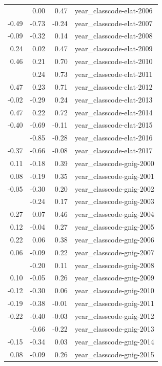 \documentclass[]{article}
\begin{document}
\begin{longtable}[t]{rrrl}
\addlinespace
0.24 & 0.00 & 0.47 & year\_classcode-elat-2006\\
-0.49 & -0.73 & -0.24 & year\_classcode-elat-2007\\
-0.09 & -0.32 & 0.14 & year\_classcode-elat-2008\\
0.24 & 0.02 & 0.47 & year\_classcode-elat-2009\\
0.46 & 0.21 & 0.70 & year\_classcode-elat-2010\\
\addlinespace
0.48 & 0.24 & 0.73 & year\_classcode-elat-2011\\
0.47 & 0.23 & 0.71 & year\_classcode-elat-2012\\
-0.02 & -0.29 & 0.24 & year\_classcode-elat-2013\\
0.47 & 0.22 & 0.72 & year\_classcode-elat-2014\\
-0.40 & -0.69 & -0.11 & year\_classcode-elat-2015\\
\addlinespace
-0.57 & -0.85 & -0.28 & year\_classcode-elat-2016\\
-0.37 & -0.66 & -0.08 & year\_classcode-elat-2017\\
0.11 & -0.18 & 0.39 & year\_classcode-gnig-2000\\
0.08 & -0.19 & 0.35 & year\_classcode-gnig-2001\\
-0.05 & -0.30 & 0.20 & year\_classcode-gnig-2002\\
\addlinespace
-0.04 & -0.24 & 0.17 & year\_classcode-gnig-2003\\
0.27 & 0.07 & 0.46 & year\_classcode-gnig-2004\\
0.12 & -0.04 & 0.27 & year\_classcode-gnig-2005\\
0.22 & 0.06 & 0.38 & year\_classcode-gnig-2006\\
0.06 & -0.09 & 0.22 & year\_classcode-gnig-2007\\
\addlinespace
-0.04 & -0.20 & 0.11 & year\_classcode-gnig-2008\\
0.10 & -0.05 & 0.26 & year\_classcode-gnig-2009\\
-0.12 & -0.30 & 0.06 & year\_classcode-gnig-2010\\
-0.19 & -0.38 & -0.01 & year\_classcode-gnig-2011\\
-0.22 & -0.40 & -0.03 & year\_classcode-gnig-2012\\
\addlinespace
-0.44 & -0.66 & -0.22 & year\_classcode-gnig-2013\\
-0.15 & -0.34 & 0.03 & year\_classcode-gnig-2014\\
0.08 & -0.09 & 0.26 & year\_classcode-gnig-2015\\

\end{longtable}
\end{document}

